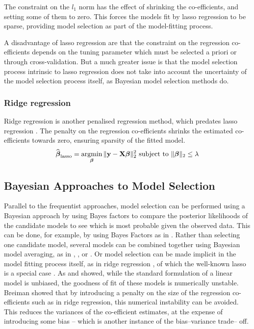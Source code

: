 The constraint on the $l_1$ norm has the effect of shrinking the co-efficients, and setting some of them to
zero. This forces the models fit by lasso regression to be sparse, providing model selection as part of the
model-fitting process.

A disadvantage of lasso regression are that the constraint on the regression co-efficients depends on the
tuning parameter which must be selected a priori or through cross-validation. But a much greater issue is that
the model selection process intrinsic to lasso regression does not take into account the uncertainty of the
model selection process itself, as Bayesian model selection methods do.

\subsubsection{Ridge regression}
Ridge regression is another penalised regression method, which predates lasso regression
\cite{Hoerl1970}. The penalty on the regression co-efficients shrinks the estimated co-efficients towards
zero, ensuring sparsity of the fitted model.
$$
\widehat{\vbeta}_{\text{lasso}} = \argmin_\vbeta \|\vy - \mX \vbeta\|_2^2 \text{ subject to } \|\vbeta\|_2 \leq \lambda
$$

\subsection{Bayesian Approaches to Model Selection}
Parallel to the frequentist approaches, model selection can be performed using a Bayesian approach by using
Bayes factors to compare the posterior likelihoods of the candidate models to see which is most probable given
the observed data. This can be done, for example, by using Bayes Factors as in \citep{Kass1993}. Rather than
selecting one candidate model, several models can be combined together using Bayesian model  averaging, as in
\citep{Hoeting1999}, \citep{Raftery1997}, \citep{Fernandez2001} or \citep{Papaspiliopoulos2016}. Or model
selection can be made implicit in the model fitting process itself, as in ridge regression
\citep{Casella1980}, of which the well-known lasso is a special case \citep{Tibshirani1996}. As
\citep{Breiman1996} and \citep{Efron2013} showed, while  the standard formulation of a linear model is
unbiased, the goodness of fit of these models is numerically  unstable. Breiman showed that by introducing a
penalty on the size of the regression co- efficients such as  in ridge regression, this numerical instability
can be avoided. This reduces the variances of the co-efficient estimates, at the expense of introducing some
bias -- which is another instance of the bias--variance trade-- off.

